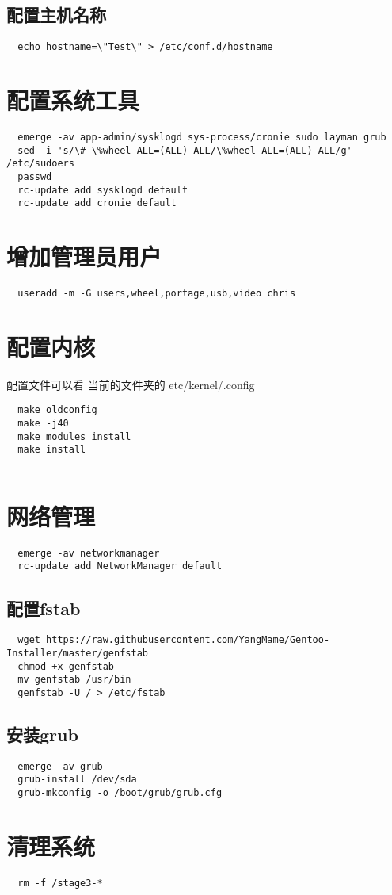 \documentclass{book}
\begin{document}
\section{配置主机名称}
\begin{lstlisting}
  echo hostname=\"Test\" > /etc/conf.d/hostname
\end{lstlisting}

\chapter{配置系统工具}
\begin{lstlisting}
  emerge -av app-admin/sysklogd sys-process/cronie sudo layman grub
  sed -i 's/\# \%wheel ALL=(ALL) ALL/\%wheel ALL=(ALL) ALL/g' /etc/sudoers
  passwd
  rc-update add sysklogd default
  rc-update add cronie default
\end{lstlisting}

\chapter{增加管理员用户}
\begin{lstlisting}
  useradd -m -G users,wheel,portage,usb,video chris
\end{lstlisting}

\chapter{配置内核}
配置文件可以看 当前的文件夹的 etc/kernel/.config

\begin{lstlisting}
  make oldconfig
  make -j40
  make modules_install
  make install
  
\end{lstlisting}
\chapter{网络管理}
\begin{lstlisting}
  emerge -av networkmanager
  rc-update add NetworkManager default
\end{lstlisting}

\section{配置fstab}


\begin{lstlisting}
  wget https://raw.githubusercontent.com/YangMame/Gentoo-Installer/master/genfstab
  chmod +x genfstab
  mv genfstab /usr/bin
  genfstab -U / > /etc/fstab 
\end{lstlisting}

\section{安装grub}

\begin{lstlisting}
  emerge -av grub
  grub-install /dev/sda
  grub-mkconfig -o /boot/grub/grub.cfg
\end{lstlisting}


\chapter{清理系统}
\begin{lstlisting}
  rm -f /stage3-*
\end{lstlisting}
\end{document}
